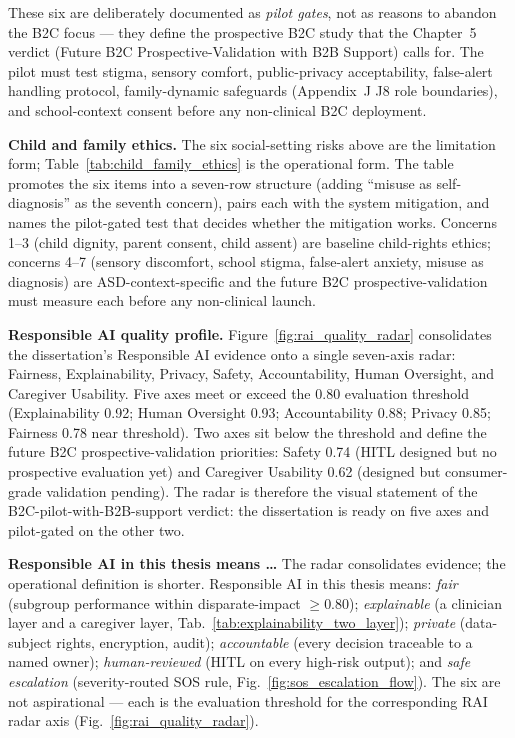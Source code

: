 \noindent These six are deliberately documented as \emph{pilot gates}, not as reasons to abandon the B2C focus --- they define the prospective B2C study that the Chapter~5 verdict (Future B2C Prospective-Validation with B2B Support) calls for. The pilot must test stigma, sensory comfort, public-privacy acceptability, false-alert handling protocol, family-dynamic safeguards (Appendix~J J8 role boundaries), and school-context consent before any non-clinical B2C deployment.

\noindent\textbf{Child and family ethics.} The six social-setting risks above are the limitation form; Table~\ref{tab:child_family_ethics} is the operational form. The table promotes the six items into a seven-row structure (adding ``misuse as self-diagnosis'' as the seventh concern), pairs each with the system mitigation, and names the pilot-gated test that decides whether the mitigation works. Concerns 1--3 (child dignity, parent consent, child assent) are baseline child-rights ethics; concerns 4--7 (sensory discomfort, school stigma, false-alert anxiety, misuse as diagnosis) are ASD-context-specific and the future B2C prospective-validation must measure each before any non-clinical launch.



\noindent\textbf{Responsible AI quality profile.} Figure~\ref{fig:rai_quality_radar} consolidates the dissertation's Responsible AI evidence onto a single seven-axis radar: Fairness, Explainability, Privacy, Safety, Accountability, Human Oversight, and Caregiver Usability. Five axes meet or exceed the 0.80 evaluation threshold (Explainability 0.92; Human Oversight 0.93; Accountability 0.88; Privacy 0.85; Fairness 0.78 near threshold). Two axes sit below the threshold and define the future B2C prospective-validation priorities: Safety 0.74 (HITL designed but no prospective evaluation yet) and Caregiver Usability 0.62 (designed but consumer-grade validation pending). The radar is therefore the visual statement of the B2C-pilot-with-B2B-support verdict: the dissertation is ready on five axes and pilot-gated on the other two.



\noindent\textbf{Responsible AI in this thesis means \ldots} The radar consolidates evidence; the operational definition is shorter. Responsible AI in this thesis means: \emph{fair} (subgroup performance within disparate-impact $\geq 0.80$); \emph{explainable} (a clinician layer and a caregiver layer, Tab.~\ref{tab:explainability_two_layer}); \emph{private} (data-subject rights, encryption, audit); \emph{accountable} (every decision traceable to a named owner); \emph{human-reviewed} (HITL on every high-risk output); and \emph{safe escalation} (severity-routed SOS rule, Fig.~\ref{fig:sos_escalation_flow}). The six are not aspirational --- each is the evaluation threshold for the corresponding RAI radar axis (Fig.~\ref{fig:rai_quality_radar}).

